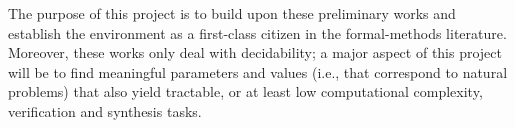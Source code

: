 \documentclass[a4paper,10pt]{article}
\begin{document}
The purpose of this project is to build upon these preliminary works and establish the environment as a first-class citizen in the formal-methods literature. Moreover, these works only deal with decidability; a major aspect of this project will be to find meaningful parameters and values (i.e., that correspond to natural problems) that also yield tractable, or at least low computational complexity, verification and synthesis tasks.





\end{document}
